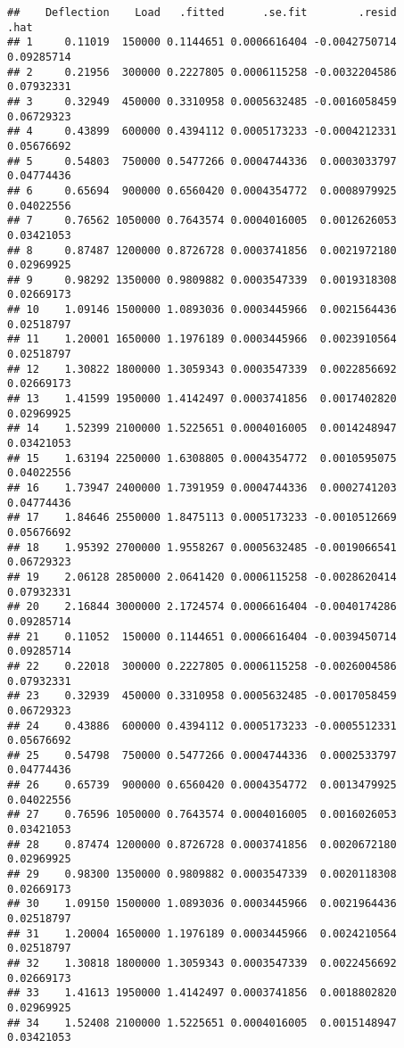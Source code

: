 \documentclass[]{book}
\theoremstyle{definition}
\theoremstyle{definition}
\theoremstyle{definition}
\theoremstyle{remark}
\begin{document}
\begin{verbatim}
##    Deflection    Load   .fitted      .se.fit        .resid       .hat
## 1     0.11019  150000 0.1144651 0.0006616404 -0.0042750714 0.09285714
## 2     0.21956  300000 0.2227805 0.0006115258 -0.0032204586 0.07932331
## 3     0.32949  450000 0.3310958 0.0005632485 -0.0016058459 0.06729323
## 4     0.43899  600000 0.4394112 0.0005173233 -0.0004212331 0.05676692
## 5     0.54803  750000 0.5477266 0.0004744336  0.0003033797 0.04774436
## 6     0.65694  900000 0.6560420 0.0004354772  0.0008979925 0.04022556
## 7     0.76562 1050000 0.7643574 0.0004016005  0.0012626053 0.03421053
## 8     0.87487 1200000 0.8726728 0.0003741856  0.0021972180 0.02969925
## 9     0.98292 1350000 0.9809882 0.0003547339  0.0019318308 0.02669173
## 10    1.09146 1500000 1.0893036 0.0003445966  0.0021564436 0.02518797
## 11    1.20001 1650000 1.1976189 0.0003445966  0.0023910564 0.02518797
## 12    1.30822 1800000 1.3059343 0.0003547339  0.0022856692 0.02669173
## 13    1.41599 1950000 1.4142497 0.0003741856  0.0017402820 0.02969925
## 14    1.52399 2100000 1.5225651 0.0004016005  0.0014248947 0.03421053
## 15    1.63194 2250000 1.6308805 0.0004354772  0.0010595075 0.04022556
## 16    1.73947 2400000 1.7391959 0.0004744336  0.0002741203 0.04774436
## 17    1.84646 2550000 1.8475113 0.0005173233 -0.0010512669 0.05676692
## 18    1.95392 2700000 1.9558267 0.0005632485 -0.0019066541 0.06729323
## 19    2.06128 2850000 2.0641420 0.0006115258 -0.0028620414 0.07932331
## 20    2.16844 3000000 2.1724574 0.0006616404 -0.0040174286 0.09285714
## 21    0.11052  150000 0.1144651 0.0006616404 -0.0039450714 0.09285714
## 22    0.22018  300000 0.2227805 0.0006115258 -0.0026004586 0.07932331
## 23    0.32939  450000 0.3310958 0.0005632485 -0.0017058459 0.06729323
## 24    0.43886  600000 0.4394112 0.0005173233 -0.0005512331 0.05676692
## 25    0.54798  750000 0.5477266 0.0004744336  0.0002533797 0.04774436
## 26    0.65739  900000 0.6560420 0.0004354772  0.0013479925 0.04022556
## 27    0.76596 1050000 0.7643574 0.0004016005  0.0016026053 0.03421053
## 28    0.87474 1200000 0.8726728 0.0003741856  0.0020672180 0.02969925
## 29    0.98300 1350000 0.9809882 0.0003547339  0.0020118308 0.02669173
## 30    1.09150 1500000 1.0893036 0.0003445966  0.0021964436 0.02518797
## 31    1.20004 1650000 1.1976189 0.0003445966  0.0024210564 0.02518797
## 32    1.30818 1800000 1.3059343 0.0003547339  0.0022456692 0.02669173
## 33    1.41613 1950000 1.4142497 0.0003741856  0.0018802820 0.02969925
## 34    1.52408 2100000 1.5225651 0.0004016005  0.0015148947 0.03421053

\end{verbatim}
\end{document}
